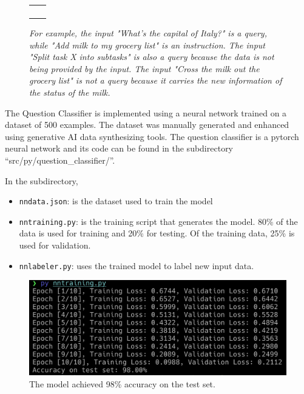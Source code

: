 \documentclass{article}
\begin{document}
\begin{figure}[H]
\begin{center}
\begin{tabular}{SS}
  \toprule
     &  \\
    \midrule
      &  \\
      &   \\
      &   \\
     &   \\
    \bottomrule
\end{tabular}
\end{center}
\caption{\it For example, the input "What's the capital of Italy?" is a query, while "Add milk to my grocery list" is an instruction. The input "Split task X into subtasks" is also a query because the data is not being provided by the input. The input "Cross the milk out the grocery list" is not a query because it carries the new information of the status of the milk.} \label{faketable:mul}
\end{figure}


The Question Classifier is implemented using a neural network trained on a dataset of 500 examples. The dataset was manually generated and enhanced using generative AI data synthesizing tools. The question classifier is a pytorch neural network and its code can be found in the subdirectory ``src/py/question\_classifier/''.

In the subdirectory,
\begin{itemize}
 \item \texttt{nndata.json}: is the dataset used to train the model
  \item \texttt{nntraining.py}: is the training script that generates the model. 80\% of the data is used for training and 20\% for testing. Of the training data, 25\% is used for validation.
  \item \texttt{nnlabeler.py}: uses the trained model to label new input data.
\end{itemize}

\begin{figure}[htbp]
\centering
\includegraphics[width=\textwidth]{question_classifier_accuracy.png}
\caption{\small The model achieved 98\% accuracy on the test set.}
\end{figure}
\end{document}
